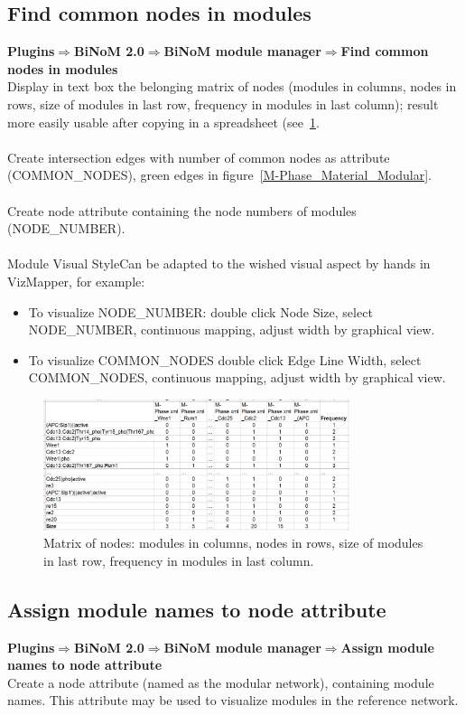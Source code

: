 \subsection{Find common nodes in modules}
\textbf{Plugins$\Rightarrow$BiNoM 2.0$\Rightarrow$BiNoM module manager$\Rightarrow$Find common nodes in modules}\\
Display in text box the belonging matrix of nodes (modules in columns, nodes in rows, size of modules in last row, frequency in modules in last column); result more easily usable after copying in a spreadsheet (see~\ref{Common_nodes_in_modules}.\\\\
Create intersection edges with number of common nodes as attribute (COMMON\_NODES), green edges in figure~\ref{M-Phase_Material_Modular}.\\\\
Create node attribute containing the node numbers of modules (NODE\_NUMBER).\\\\
Module Visual StyleCan be adapted to the wished visual aspect by hands in VizMapper, for example:
\begin{itemize}
\item To visualize NODE\_NUMBER: double click Node Size, select NODE\_NUMBER, continuous mapping, adjust width by graphical view.
\item To visualize COMMON\_NODES double click Edge Line Width, select COMMON\_NODES, continuous mapping, adjust width by graphical view.
\end{itemize}
\begin{figure}
\centering
\includegraphics[width=0.8\textwidth]{graphics/Common_nodes_in_modules}
\caption{Matrix of nodes: modules in columns, nodes in rows, size of modules in last row, frequency in modules in last column.}
\label{Common_nodes_in_modules}
\end{figure}

\subsection{Assign module names to node attribute}
\textbf{Plugins$\Rightarrow$BiNoM 2.0$\Rightarrow$BiNoM module manager$\Rightarrow$Assign module names to node attribute}\\
Create a node attribute (named as the modular network), containing module names. This attribute may be used to visualize modules in the reference network.

